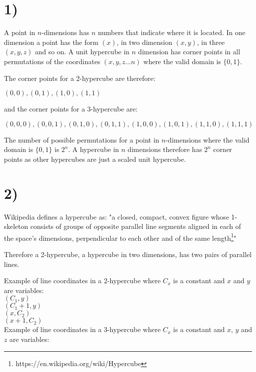 \section*{1)}

A point in $n$-dimensions has $n$ numbers that indicate where it is located. In one dimension a point has the form $(x)$, in two dimension $(x, y)$, in three $(x, y, z)$ and so on. A unit hypercube in $n$ dimension has corner points in all permutations of the coordinates $(x, y, z...n)$ where the valid domain is $\{0, 1\}$. 

The corner points for a 2-hypercube are therefore:
\begin{center}
$(0,0), (0,1), (1,0), (1,1)$
\end{center}
and the corner points for a 3-hypercube are:
\begin{center}
$(0,0,0), (0,0,1), (0,1,0), (0,1,1), (1,0,0), (1,0,1), (1,1,0), (1,1,1)$
\end{center}
The number of possible permutations for a point in $n$-dimensions where the valid domain is $\{0, 1\}$ is $2^n$. A hypercube in $n$ dimensions therefore has $2^n$ corner points as other hypercubes are just a scaled unit hypercube. 

\section*{2)}
Wikipedia defines a hypercube as: "a closed, compact, convex figure whose 1-skeleton consists of groups of opposite parallel line segments aligned in each of the space's dimensions, perpendicular to each other and of the same length\footnote{https://en.wikipedia.org/wiki/Hypercube}"

Therefore a 2-hypercube, a hypercube in two dimensions, has two pairs of parallel lines.

Example of line coordinates in a 2-hypercube where $C_x$ is a constant and $x$ and $y$ are variables:\\ 
$(C_1, y)$ \\
$(C_1 +1, y)$ \\
$(x, C_2)$ \\
$(x+1, C_2)$ \\

\noindent Example of line coordinates in a 3-hypercube where $C_x$ is a constant and $x$, $y$ and $z$ are variables:\\


